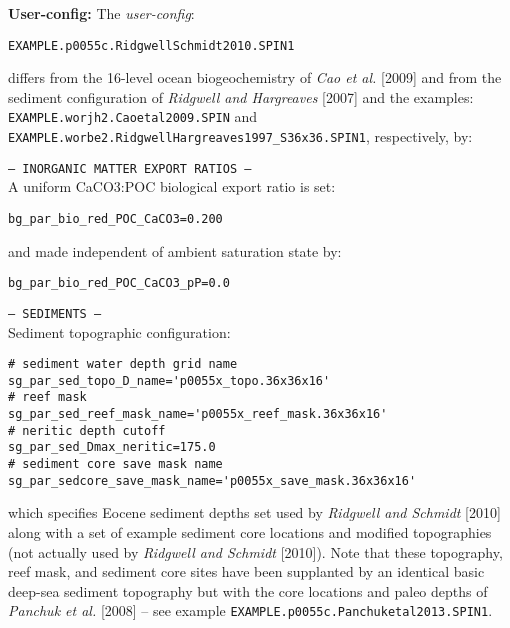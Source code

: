 \documentclass[10pt,twoside]{article}
\begin{document}
\noindent \textbf{User-config:} The \textit{user-config}:
\vspace{-10pt}\begin{verbatim}EXAMPLE.p0055c.RidgwellSchmidt2010.SPIN1\end{verbatim}\vspace{-10pt}
differs from the 16-level ocean biogeochemistry of \textit{Cao et al.} [2009] and from the sediment configuration of \textit{Ridgwell and Hargreaves} [2007] and the examples:
\\ \texttt{EXAMPLE.worjh2.Caoetal2009.SPIN} and \texttt{EXAMPLE.worbe2.RidgwellHargreaves1997\_S36x36.SPIN1}, respectively, by:
\begin{compactitem}
                \item \texttt{--- INORGANIC MATTER EXPORT RATIOS ---}
                \\ A uniform CaCO3:POC biological export ratio is set:
\vspace{-5pt}\begin{verbatim}bg_par_bio_red_POC_CaCO3=0.200\end{verbatim}\vspace{-5pt}
and made independent of ambient saturation state by:
\vspace{-5pt}\begin{verbatim}bg_par_bio_red_POC_CaCO3_pP=0.0\end{verbatim}\vspace{-5pt}
                \item \texttt{--- SEDIMENTS ---}
                \\ Sediment topographic configuration:
\vspace{-5pt}\begin{verbatim}
# sediment water depth grid name
sg_par_sed_topo_D_name='p0055x_topo.36x36x16'
# reef mask
sg_par_sed_reef_mask_name='p0055x_reef_mask.36x36x16'
# neritic depth cutoff
sg_par_sed_Dmax_neritic=175.0
# sediment core save mask name
sg_par_sedcore_save_mask_name='p0055x_save_mask.36x36x16'               
\end{verbatim}\vspace{-5pt}
which specifies Eocene sediment depths set used by \textit{Ridgwell and Schmidt} [2010] along with a set of example sediment core locations and modified topographies (not actually used by \textit{Ridgwell and Schmidt} [2010]).
Note that these topography, reef mask, and sediment core sites have been supplanted by an identical basic deep-sea sediment topography but with the core locations and paleo depths of \textit{Panchuk et al.} [2008] -- see example \texttt{EXAMPLE.p0055c.Panchuketal2013.SPIN1}.

\end{compactitem}
\end{document}
